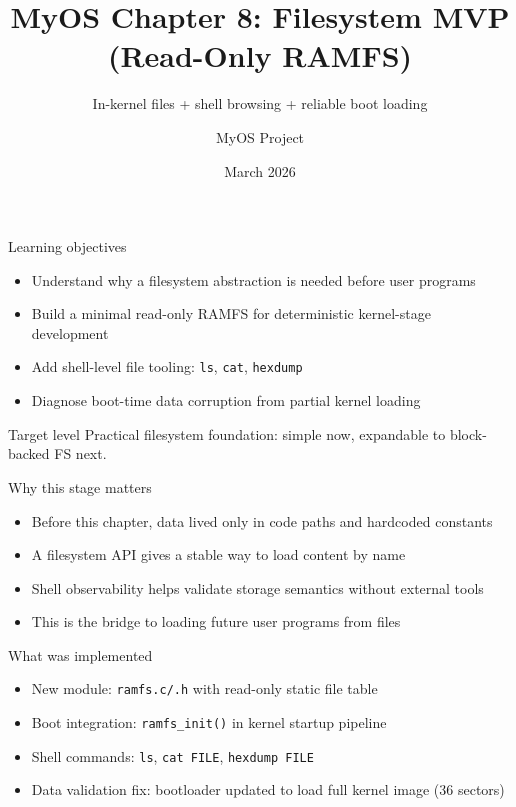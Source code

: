 \documentclass[aspectratio=169]{beamer}
\title[MyOS Chapter 8]{\textbf{MyOS Chapter 8: Filesystem MVP (Read-Only RAMFS)}}
\subtitle{In-kernel files + shell browsing + reliable boot loading}
\author{MyOS Project}
\date{March 2026}
\institute{x86 Protected Mode Kernel Engineering}
\newcommand{\concept}[2]{%
  \begin{block}{#1}\smallskip #2\smallskip\end{block}\vspace{5pt}}
\begin{document}
\begin{frame}
  \titlepage
\end{frame}

\begin{frame}{Learning objectives}
  \begin{itemize}
    \item Understand why a filesystem abstraction is needed before user programs
    \item Build a minimal read-only RAMFS for deterministic kernel-stage development
    \item Add shell-level file tooling: \texttt{ls}, \texttt{cat}, \texttt{hexdump}
    \item Diagnose boot-time data corruption from partial kernel loading
  \end{itemize}
  \concept{Target level}{
    Practical filesystem foundation: simple now, expandable to block-backed FS next.
  }
\end{frame}

\begin{frame}{Why this stage matters}
  \begin{itemize}
    \item Before this chapter, data lived only in code paths and hardcoded constants
    \item A filesystem API gives a stable way to load content by name
    \item Shell observability helps validate storage semantics without external tools
    \item This is the bridge to loading future user programs from files
  \end{itemize}
\end{frame}

\begin{frame}{What was implemented}
  \begin{itemize}
    \item New module: \texttt{ramfs.c/.h} with read-only static file table
    \item Boot integration: \texttt{ramfs\_init()} in kernel startup pipeline
    \item Shell commands: \texttt{ls}, \texttt{cat FILE}, \texttt{hexdump FILE}
    \item Data validation fix: bootloader updated to load full kernel image (36 sectors)
  \end{itemize}
\end{frame}
\end{document}
